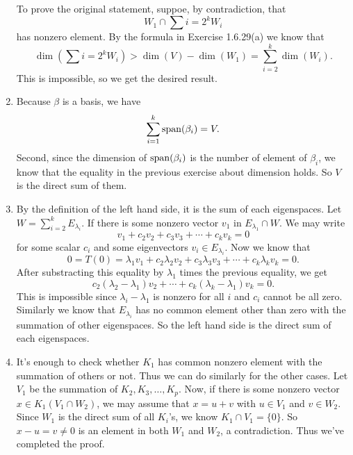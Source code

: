 \begin{enumerate}
To prove the original statement, suppoe, by contradiction, that 
\[W_1\cap \sum{i=2}^k{W_i}\]
has nonzero element. By the formula in Exercise 1.6.29(a) we know that 
\[\dim(\sum{i=2}^k{W_i})>\dim(V)-\dim(W_1)=\sum_{i=2}^k{\dim(W_i)}.\]
This is impossible, so we get the desired result.
\item Because $\beta $ is a basis, we have 
\[\sum_{i=1}^k{\sp(\beta_i)}=V.\]
Second, since the dimension of $\sp(\beta_i)$ is the number of element of $\beta_i$, we know that the equality in the previous exercise about dimension holds. So $V$ is the direct sum of them.
\item By the definition of the left hand side, it is the sum of each eigenspaces. Let $W=\sum_{i=2}^k{E_{\lambda_i}}$. If there is some nonzero vector $v_1$ in $E_{\lambda_1}\cap W$. We may write 
\[v_1+c_2v_2+c_3v_3+\cdots +c_kv_k=0\]
for some scalar $c_i$ and some eigenvectors $v_i\in E_{\lambda_i}$. Now we know that 
\[0=T(0)=\lambda_1v_1+c_2\lambda_2v_2+c_3\lambda_3v_3+\cdots +c_k\lambda_kv_k=0.\]
After substracting this equality by $\lambda_1$ times the previous equality, we get 
\[c_2(\lambda_2-\lambda_1)v_2+\cdots +c_k(\lambda_k-\lambda_1)v_k=0.\]
This is impossible since $\lambda_i-\lambda_1$ is nonzero for all $i$ and $c_i$ cannot be all zero. Similarly we know that $E_{\lambda_i}$ has no common element other than zero with the summation of other eigenspaces. So the left hand side is the direct sum of each eigenspaces.
\item It's enough to check whether $K_1$ has common nonzero element with the summation of others or not. Thus we can do similarly for the other cases. Let $V_1$ be the summation of $K_2,K_3,\ldots ,K_p$. Now, if there is some nonzero vector $x\in K_1(V_1\cap W_2)$, we may assume that $x=u+v$ with $u\in V_1$ and $v\in W_2$. Since $W_1$ is the direct sum of all $K_i$'s, we know $K_1\cap V_1=\{0\}$. So $x-u=v\neq 0$ is an element in both $W_1$ and $W_2$, a contradiction. Thus we've completed the proof.
\end{enumerate}
